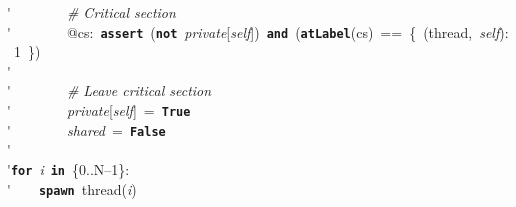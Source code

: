 \'\>~~~~~~~~\emph{\# Critical section}\\

\'\>~~~~~~~~@cs:~\texttt{\textbf{assert}}~(\texttt{\textbf{not}}~\textit{private}[\textit{self}])~\texttt{\textbf{and}}~(\texttt{\textbf{atLabel}}(cs)~==~\{~(thread,~\textit{self}):~1~\})\\

\'\>\\

\'\>~~~~~~~~\emph{\# Leave critical section}\\

\'\>~~~~~~~~\textit{private}[\textit{self}]~=~\texttt{\textbf{True}}\\

\'\>~~~~~~~~\textit{shared}~=~\texttt{\textbf{False}}\\

\'\>\\

\'\>\texttt{\textbf{for}}~\textit{i}~\texttt{\textbf{in}}~\{0..N--1\}:\\

\'\>~~~~\texttt{\textbf{spawn}}~thread(\textit{i})